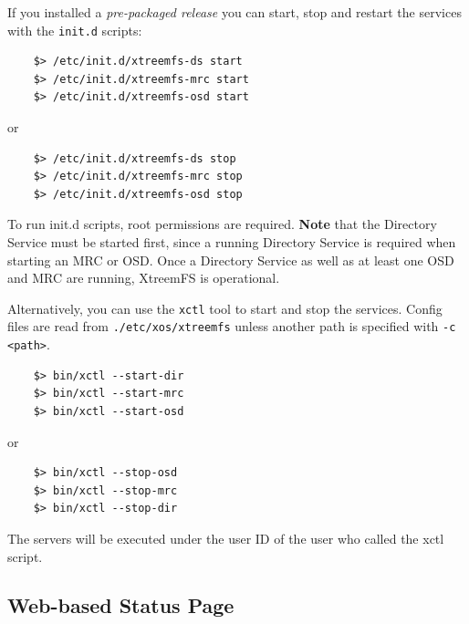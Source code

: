 \documentclass[a4paper,10pt]{book}
\begin{document}
If you installed a \emph{pre-packaged release} you can start, stop and restart the services with the \texttt{init.d} scripts:
	\begin{verbatim}
	$> /etc/init.d/xtreemfs-ds start
	$> /etc/init.d/xtreemfs-mrc start
	$> /etc/init.d/xtreemfs-osd start
	\end{verbatim}
or
	\begin{verbatim}
	$> /etc/init.d/xtreemfs-ds stop
	$> /etc/init.d/xtreemfs-mrc stop
	$> /etc/init.d/xtreemfs-osd stop
	\end{verbatim}


To run init.d scripts, root permissions are required. \textbf{Note} that the Directory Service must be started first, since a running Directory Service is required when starting an MRC or OSD. Once a Directory Service as well as at least one OSD and MRC are running, XtreemFS is operational.

Alternatively, you can use the \texttt{xctl} tool to start and stop the services. Config files are read from \texttt{./etc/xos/xtreemfs} unless another path is specified with \texttt{-c <path>}.

	\begin{verbatim}
	$> bin/xctl --start-dir
	$> bin/xctl --start-mrc
	$> bin/xctl --start-osd
	\end{verbatim}
or
	\begin{verbatim}
	$> bin/xctl --stop-osd
	$> bin/xctl --stop-mrc
	$> bin/xctl --stop-dir
	\end{verbatim}

The servers will be executed under the user ID of the user who called the xctl script.

\subsection{Web-based Status Page}
\end{document}

